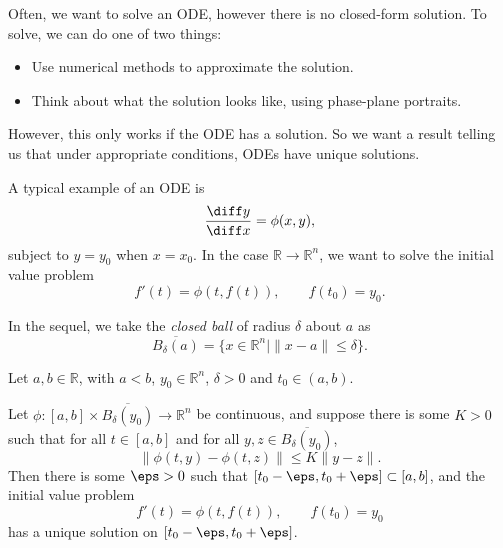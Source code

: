 \documentclass[12pt]{article}
\begin{document}
Often, we want to solve an ODE, however there is no closed-form solution. To solve, we can do one of two things:
\begin{itemize}
	\item Use numerical methods to approximate the solution.
	\item Think about what the solution looks like, using phase-plane portraits.
\end{itemize}

However, this only works if the ODE has a solution. So we want a result telling us that under appropriate conditions, ODEs have unique solutions.

A typical example of an ODE is
\[
\frac{\diff y}{\diff x} = \phi(x, y)
,\]
subject to $y = y_0$ when $x = x_0$. In the case $\mathbb{R} \to \mathbb{R}^{n}$, we want to solve the initial value problem
\[
f'(t) = \phi(t, f(t)), \qquad f(t_0) = y_0
.\]

In the sequel, we take the \textit{closed ball} of radius $\delta$ about $a$ as
\[
	\overline{B_{\delta}(a)} = \{x \in \mathbb{R}^{n} \mid \|x - a\| \leq \delta\}
.\]

\begin{theorem}
	Let $a, b \in \mathbb{R}$, with $a < b$, $y_0 \in \mathbb{R}^{n}$, $\delta > 0$ and $t_0 \in (a, b)$.

	Let $\phi : [a, b] \times \overline{B_{\delta}(y_0)} \to \mathbb{R}^{n}$ be continuous, and suppose there is some $K > 0$ such that for all $t \in [a, b]$ and for all $y, z \in \overline{B_{\delta}(y_0)}$,
	\[
	\|\phi(t, y) - \phi(t ,z)\| \leq K\|y-z\|
	.\]
	Then there is some $\eps > 0$ such that $[t_0 - \eps, t_0 + \eps] \subset [a, b]$, and the initial value problem
	\[
	f'(t) = \phi(t, f(t)), \qquad f(t_0) = y_0
	\]
	has a unique solution on $[t_0 - \eps, t_0 + \eps]$.
\end{theorem}
\end{document}
